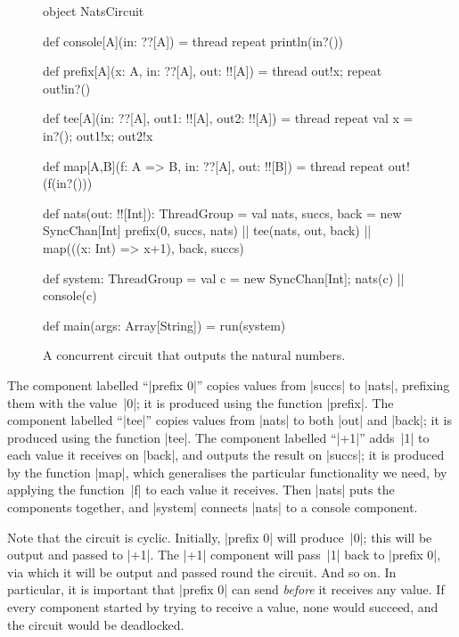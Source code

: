 
\begin{figure}
\begin{scala}
object NatsCircuit{
  def console[A](in: ??[A]) = thread{ repeat{ println(in?()) } }

  def prefix[A](x: A, in: ??[A], out: !![A]) = thread{
    out!x; repeat{ out!in?() }
  }

  def tee[A](in: ??[A], out1: !![A], out2: !![A]) = thread{
    repeat{ val x = in?(); out1!x; out2!x }
  }

  def map[A,B](f: A => B, in: ??[A], out: !![B]) = thread{
    repeat{ out!(f(in?())) }
  }

  def nats(out: !![Int]): ThreadGroup = {
    val nats, succs, back = new SyncChan[Int]
    prefix(0, succs, nats) || tee(nats, out, back) ||
      map(((x: Int) => x+1), back, succs)
  }

  def system: ThreadGroup = {
    val c = new SyncChan[Int]; nats(c) || console(c)
  }

  def main(args: Array[String]) = run(system)
}
\end{scala}
\caption{A concurrent circuit that outputs the natural numbers.}
\label{fig:NatsCircuit}
\end{figure}

The component labelled ``|prefix 0|'' copies values from |succs| to |nats|,
prefixing them with the value~|0|; it is produced using the function |prefix|.
The component labelled ``|tee|'' copies values from |nats| to both |out| and
|back|; it is produced using the function |tee|.  The component labelled
``|+1|'' adds~|1| to each value it receives on |back|, and outputs the result
on |succs|; it is produced by the function |map|, which generalises the
particular functionality we need, by applying the function~|f| to each value
it receives.  Then |nats| puts the components together, and |system| connects
|nats| to a console component.

Note that the circuit is cyclic.  Initially, |prefix 0| will produce~|0|; this
will be output and passed to |+1|.  The |+1| component will pass~|1| back to
|prefix 0|, via which it will be output and passed round the circuit.  And so
on.  In particular, it is important that |prefix 0| can send \emph{before} it
receives any value.  If every component started by trying to receive a value,
none would succeed, and the circuit would be deadlocked. 






